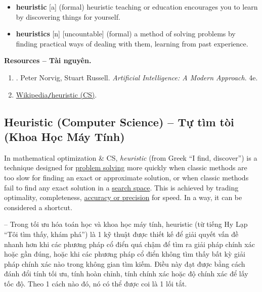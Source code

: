 \documentclass{article}
\begin{document}
\begin{itemize}\sf\small
	\item \textbf{heuristic} [a] (formal) heuristic teaching or education encourages you to learn by discovering things for yourself.
	\item \textbf{heuristics} [n] [uncountable] (formal) a method of solving problems by finding practical ways of dealing with them, learning from past experience.
\end{itemize}
\textbf{\textbf{Resources -- Tài nguyên.}}
\begin{enumerate}
	\item \cite{Norvig_Russell2021}. {\sc Peter Norvig, Stuart Russell}. {\it Artificial Intelligence: A Modern Approach}. 4e.
	
	\item \href{https://en.wikipedia.org/wiki/Heuristic_(computer_science)}{Wikipedia{\tt/}heuristic (CS)}.
\end{enumerate}




\subsection{Heuristic (Computer Science) -- Tự tìm tòi (Khoa Học Máy Tính)}
In mathematical optimization \& CS, {\it heuristic} (from Greek ``I find, discover'') is a technique designed for \href{https://en.wikipedia.org/wiki/Problem_solving}{problem solving} more quickly when classic methods are too slow for finding an exact or approximate solution, or when classic methods fail to find any exact solution in a \href{https://en.wikipedia.org/wiki/Space_complexity}{search space}. This is achieved by trading optimality, completeness, \href{https://en.wikipedia.org/wiki/Accuracy_and_precision}{accuracy or precision} for speed. In a way, it can be considered a shortcut.

-- Trong tối ưu hóa toán học và khoa học máy tính, heuristic (từ tiếng Hy Lạp ``Tôi tìm thấy, khám phá'') là 1 kỹ thuật được thiết kế để giải quyết vấn đề nhanh hơn khi các phương pháp cổ điển quá chậm để tìm ra giải pháp chính xác hoặc gần đúng, hoặc khi các phương pháp cổ điển không tìm thấy bất kỳ giải pháp chính xác nào trong không gian tìm kiếm. Điều này đạt được bằng cách đánh đổi tính tối ưu, tính hoàn chỉnh, tính chính xác hoặc độ chính xác để lấy tốc độ. Theo 1 cách nào đó, nó có thể được coi là 1 lối tắt.
\end{document}
